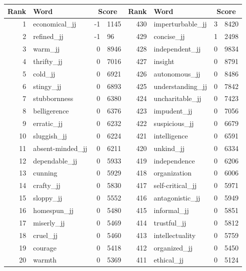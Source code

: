 \begin{table}[tbp]
    \begin{tabular}{| rlr@{.}l | rlr@{.}l |}
    \hline
    \textbf{Rank} & \textbf{Word} & \multicolumn{2}{c|}{\textbf{Score}} & \textbf{Rank} & \textbf{Word} & \multicolumn{2}{c|}{\textbf{Score}} \\
    \hline
    1 & economical\_jj & -1 & 1145    &    430 & imperturbable\_jj & 3 & 8420 \\
    2 & refined\_jj & -1 & 96    &    429 & concise\_jj & 1 & 2498 \\
    3 & warm\_jj & 0 & 8946    &    428 & independent\_jj & 0 & 9834 \\
    4 & thrifty\_jj & 0 & 7016    &    427 & insight & 0 & 8791 \\
    5 & cold\_jj & 0 & 6921    &    426 & autonomous\_jj & 0 & 8486 \\
    6 & stingy\_jj & 0 & 6893    &    425 & understanding\_jj & 0 & 7842 \\
    7 & stubbornness & 0 & 6380    &    424 & uncharitable\_jj & 0 & 7423 \\
    8 & belligerence & 0 & 6376    &    423 & impudent\_jj & 0 & 7056 \\
    9 & erratic\_jj & 0 & 6232    &    422 & suspicious\_jj & 0 & 6679 \\
    10 & sluggish\_jj & 0 & 6224    &    421 & intelligence & 0 & 6591 \\
    11 & absent-minded\_jj & 0 & 6211    &    420 & unkind\_jj & 0 & 6334 \\
    12 & dependable\_jj & 0 & 5933    &    419 & independence & 0 & 6206 \\
    13 & cunning & 0 & 5929    &    418 & organization & 0 & 6006 \\
    14 & crafty\_jj & 0 & 5830    &    417 & self-critical\_jj & 0 & 5971 \\
    15 & sloppy\_jj & 0 & 5552    &    416 & antagonistic\_jj & 0 & 5949 \\
    16 & homespun\_jj & 0 & 5480    &    415 & informal\_jj & 0 & 5851 \\
    17 & miserly\_jj & 0 & 5469    &    414 & trustful\_jj & 0 & 5812 \\
    18 & cruel\_jj & 0 & 5460    &    413 & intellectuality & 0 & 5759 \\
    19 & courage & 0 & 5418    &    412 & organized\_jj & 0 & 5450 \\
    20 & warmth & 0 & 5369    &    411 & ethical\_jj & 0 & 5124 \\

\end{tabular}
\end{table}
